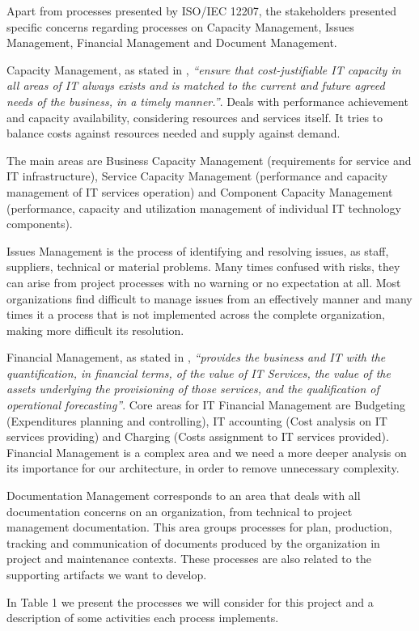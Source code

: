 Apart from processes presented by ISO/IEC 12207, the stakeholders presented specific concerns regarding processes on Capacity Management, Issues Management, Financial Management and Document Management.\par
Capacity Management, as stated in \cite{itilSD}, \textit{``ensure that cost-justifiable IT capacity in all areas of IT always exists and is matched to the current and future agreed needs of the business, in a timely manner.''}. Deals with performance achievement and capacity availability, considering resources and services itself. It tries to balance costs against resources needed and supply against demand.\par
The main areas are Business Capacity Management (requirements for service and IT infrastructure), Service Capacity Management (performance and capacity management of IT services operation) and Component Capacity Management (performance, capacity and utilization management of individual IT technology components).\par
Issues Management is the process of identifying and resolving issues, as staff, suppliers, technical or material problems. Many times confused with risks, they can arise from project processes with no warning or no expectation at all. Most organizations find difficult to manage issues from an effectively manner and many times it a process that is not implemented across the complete organization, making more difficult its resolution.\par
Financial Management, as stated in \cite{itilSS}, \textit{``provides the business and IT with the quantification, in financial terms, of the value of IT Services, the value of the assets underlying the provisioning of those services, and the qualification of operational forecasting''}. Core areas for IT Financial Management are Budgeting (Expenditures planning and controlling), IT accounting (Cost analysis on IT services providing) and Charging (Costs assignment to IT services provided). Financial Management is a complex area and we need a more deeper analysis on its importance for our architecture, in order to remove unnecessary complexity.\par
Documentation Management corresponds to an area that deals with all documentation concerns on an organization, from technical to project management documentation. This area groups processes for plan, production, tracking and communication of documents produced by the organization in project and maintenance contexts. These processes are also related to the supporting artifacts we want to develop.\par
In Table 1 we present the processes we will consider for this project and a description of some activities each process implements.


